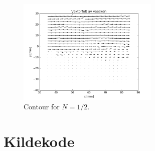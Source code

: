 \documentclass{article}
\begin{document}
\begin{figure}[H]
\centering
\includegraphics[width=0.6\textwidth]{problem_c_1}
\caption{Contour for $N=1/2$.}
\label{fig:problem_b_vector_fig}
\end{figure}




\section*{Kildekode}
\hypertarget{sourcecode}{}

\end{document}
